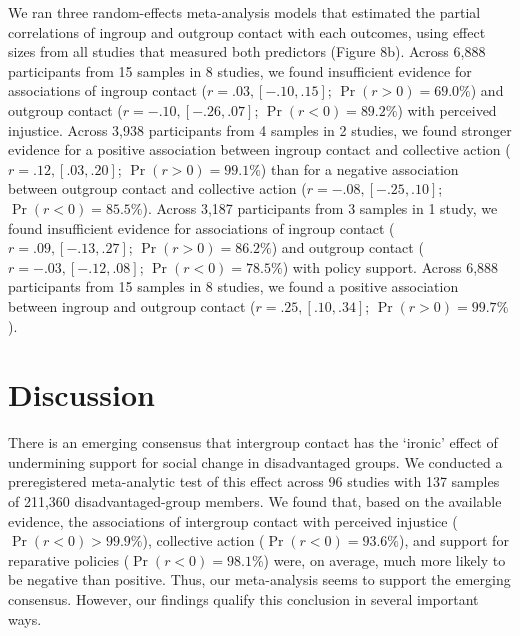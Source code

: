 \documentclass[12pt, letterpaper]{article}
\begin{document}
We ran three random-effects meta-analysis models that estimated the
partial correlations of ingroup and outgroup contact with each outcomes,
using effect sizes from all studies that measured both predictors
(Figure 8b). Across 6,888 participants from 15 samples in 8 studies, we
found insufficient evidence for associations of ingroup contact
(\(r = .03, [-.10, .15]\); \(\Pr (r > 0) = 69.0\%\)) and outgroup
contact (\(r = -.10, [-.26, .07]\); \(\Pr (r < 0) = 89.2\%\)) with
perceived injustice. Across 3,938 participants from 4 samples in 2
studies, we found stronger evidence for a positive association between
ingroup contact and collective action (\(r = .12, [.03, .20]\);
\(\Pr (r > 0) = 99.1\%\)) than for a negative association between
outgroup contact and collective action (\(r = -.08, [-.25, .10]\);
\(\Pr (r < 0) = 85.5\%\)). Across 3,187 participants from 3 samples in 1
study, we found insufficient evidence for associations of ingroup
contact (\(r = .09, [-.13, .27]\); \(\Pr (r > 0) = 86.2\%\)) and
outgroup contact (\(r = -.03, [-.12, .08]\); \(\Pr (r < 0) = 78.5\%\))
with policy support. Across 6,888 participants from 15 samples in 8
studies, we found a positive association between ingroup and outgroup
contact (\(r = .25, [.10, .34]\); \(\Pr (r > 0) = 99.7\%\)).

\hypertarget{discussion}{%
\section{Discussion}\label{discussion}}

There is an emerging consensus that intergroup contact has the `ironic'
effect of undermining support for social change in disadvantaged groups.
We conducted a preregistered meta-analytic test of this effect across 96
studies with 137 samples of 211,360 disadvantaged-group members. We
found that, based on the available evidence, the associations of
intergroup contact with perceived injustice (\(\Pr (r < 0) > 99.9\%\)),
collective action (\(\Pr (r < 0) = 93.6\%\)), and support for reparative
policies (\(\Pr (r < 0) = 98.1\%\)) were, on average, much more likely
to be negative than positive. Thus, our meta-analysis seems to support
the emerging consensus. However, our findings qualify this conclusion in
several important ways.
\end{document}
